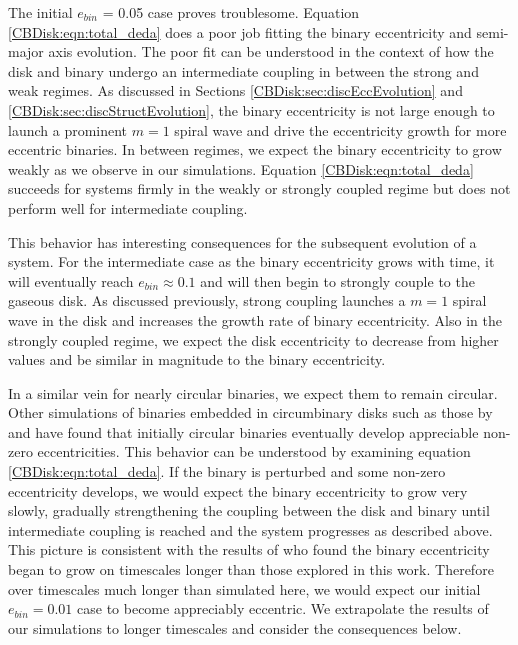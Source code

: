 The initial $e_{bin}$ = 0.05 case proves troublesome.  Equation \ref{CBDisk:eqn:total_deda} does a poor job fitting the binary eccentricity and semi-major axis evolution.  The poor fit can be understood in the context of how the disk and binary undergo an intermediate coupling in between the strong and weak regimes.  As discussed in Sections \ref{CBDisk:sec:discEccEvolution} and \ref{CBDisk:sec:discStructEvolution}, the binary eccentricity is not large enough to launch a prominent $m = 1$ spiral wave and drive the eccentricity growth for more eccentric binaries.  In between regimes, we expect the binary eccentricity to grow weakly as we observe in our simulations.  Equation \ref{CBDisk:eqn:total_deda} succeeds for systems firmly in the weakly or strongly coupled regime but does not perform well for intermediate coupling.

This behavior has interesting consequences for the subsequent evolution of a system.  For the intermediate case as the binary eccentricity grows with time, it will eventually reach $e_{bin} \approx 0.1$ and will then begin to strongly couple to the gaseous disk.  As discussed previously, strong coupling launches a $m = 1$ spiral wave in the disk and increases the growth rate of binary eccentricity.  Also in the strongly coupled regime, we expect the disk eccentricity to decrease from higher values and be similar in magnitude to the binary eccentricity.  

In a similar vein for nearly circular binaries, we expect them to remain circular.  Other simulations of binaries embedded in circumbinary disks such as those by \citet{Pierens2007} and \citet{Cuadra2009} have found that initially circular binaries eventually develop appreciable non-zero eccentricities.  This behavior can be understood by examining equation \ref{CBDisk:eqn:total_deda}.  If the binary is perturbed and some non-zero eccentricity develops, we would expect the binary eccentricity to grow very slowly, gradually strengthening the coupling between the disk and binary until intermediate coupling is reached and the system progresses as described above.  This picture is consistent with the results of \citet{Pierens2007} who found the binary eccentricity began to grow on timescales longer than those explored in this work.  Therefore over timescales much longer than simulated here, we would expect our initial $e_{bin} = 0.01$ case to become appreciably eccentric.  We extrapolate the results of our simulations to longer timescales and consider the consequences below.


